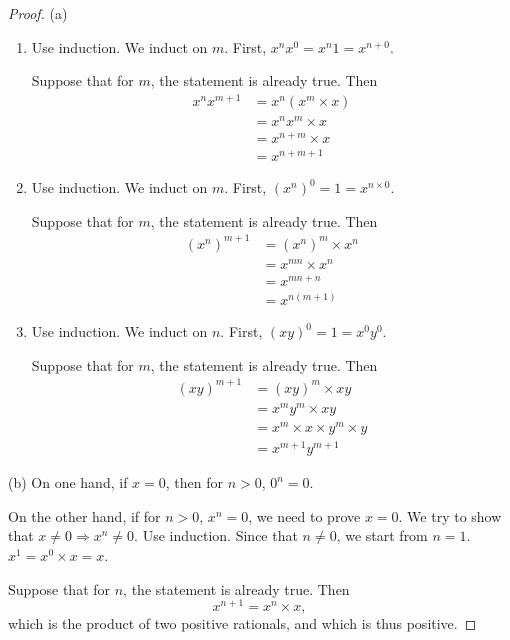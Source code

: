 \begin{proof}
(a)
\begin{enumerate}
\item Use induction. We induct on $m$. First, $x^nx^0 = x^n1 = x^{n+0}$.

Suppose that for $m$, the statement is already true. Then 
\begin{align*}
x^nx^{m+1} 
&= x^n(x^m\times x)\\
&= x^nx^m \times x \\
&= x^{n+m} \times x \tag{The induction hypothesis} \\
&= x^{n+m+1}
\end{align*}

\item Use induction. We induct on $m$. First, $(x^n)^0 = 1 = x^{n\times 0}$.

Suppose that for $m$, the statement is already true. Then 
\begin{align*}
(x^n)^{m+1} 
&= (x^n)^m \times x^n \\
&= x^{mn} \times x^n \tag{The induction hypothesis} \\
&= x^{mn + n} \tag{By the previous statement} \\
&= x^{n(m+1)}
\end{align*}

\item Use induction. We induct on $n$. First, $(xy)^0 = 1 = x^0y^0$.

Suppose that for $m$, the statement is already true. Then 
\begin{align*}
(xy)^{m+1} 
&= (xy)^m \times xy \\
&= x^my^m \times xy \tag{The induction hypothesis} \\
&= x^m \times x \times y^m \times y \\
&= x^{m+1} y^{m+1}
\end{align*}
\end{enumerate}

(b)
On one hand, if $x=0$, then for $n>0$, $0^n=0$.

On the other hand, if for $n>0$, $x^n=0$, we need to prove $x=0$. We try to show that 
$x \neq 0 \Longrightarrow x^n \neq 0$. Use induction. Since that $n\neq 0$, we start from $n=1$. 
$x^1 = x^0 \times x = x$. 

Suppose that for $n$, the statement is already true. Then 
\[
x^{n+1} = x^n \times x,
\]
which is the product of two positive rationals, and which is thus positive. 


\end{proof}
